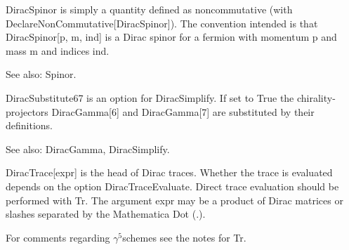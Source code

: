 




DiracSpinor is simply a quantity defined as noncommutative (with DeclareNonCommutative[DiracSpinor]). The convention intended is that
  DiracSpinor[p, m, ind] is a Dirac spinor for a fermion with momentum p and mass m and indices ind.

See also: Spinor.



DiracSubstitute67 is an option for DiracSimplify. If set to True the chirality-projectors DiracGamma[6] and DiracGamma[7] are substituted
  by their definitions.

See also: DiracGamma, DiracSimplify.



DiracTrace[expr] is the head of Dirac traces. Whether the trace is evaluated depends on the option DiracTraceEvaluate. Direct trace
  evaluation should be performed with Tr. The argument expr may be a product of Dirac matrices or slashes separated by the Mathematica
  Dot (.).



For comments regarding \({{\gamma }^5}\)schemes see the notes for Tr.

